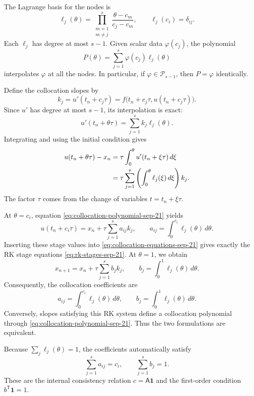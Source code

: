 The Lagrange basis for the nodes is
\begin{equation}\label{eq:lagrange-basis-sep-21}
 \ell_j(\theta)
   =\prod_{\substack{m=1\\m\neq j}}^s
     \frac{\theta-c_m}{c_j-c_m},
 \qquad \ell_j(c_i)=\delta_{ij}.
\end{equation}
Each \(\ell_j\) has degree at most \(s-1\). Given scalar data
\(\varphi(c_j)\), the polynomial
\[
 P(\theta)=\sum_{j=1}^s\varphi(c_j)\ell_j(\theta)
\]
interpolates \(\varphi\) at all the nodes. In particular, if
\(\varphi\in\mathcal P_{s-1}\), then \(P=\varphi\) identically.

Define the collocation slopes by
\[
 k_j=u'(t_n+c_j\tau)
    =f\bigl(t_n+c_j\tau,u(t_n+c_j\tau)\bigr).
\]
Since \(u'\) has degree at most \(s-1\), its interpolation is exact:
\begin{equation}\label{eq:collocation-derivative-sep-21}
 u'(t_n+\theta\tau)=\sum_{j=1}^s k_j\ell_j(\theta).
\end{equation}
Integrating and using the initial condition gives
\begin{align}
 u(t_n+\theta\tau)-x_n
  &=\tau\int_0^\theta u'(t_n+\xi\tau)\,d\xi\notag\\
  &=\tau\sum_{j=1}^s
      \left(\int_0^\theta\ell_j(\xi)\,d\xi\right)k_j.
      \label{eq:collocation-polynomial-sep-21}
\end{align}
The factor \(\tau\) comes from the change of variables
\(t=t_n+\xi\tau\).

At \(\theta=c_i\), equation
\eqref{eq:collocation-polynomial-sep-21} yields
\[
 u(t_n+c_i\tau)=x_n+\tau\sum_{j=1}^s a_{ij}k_j,
 \qquad
 a_{ij}=\int_0^{c_i}\ell_j(\theta)\,d\theta.
\]
Inserting these stage values into
\eqref{eq:collocation-equations-sep-21} gives exactly the RK stage
equations \eqref{eq:rk-stages-sep-21}. At \(\theta=1\), we obtain
\[
 x_{n+1}=x_n+\tau\sum_{j=1}^s b_jk_j,
 \qquad
 b_j=\int_0^1\ell_j(\theta)\,d\theta.
\]
Consequently, the collocation coefficients are
\begin{equation}\label{eq:collocation-coefficients-sep-21}
 \boxed{
  a_{ij}=\int_0^{c_i}\ell_j(\theta)\,d\theta,
  \qquad
  b_j=\int_0^1\ell_j(\theta)\,d\theta.}
\end{equation}
Conversely, slopes satisfying this RK system define a collocation
polynomial through \eqref{eq:collocation-polynomial-sep-21}.
Thus the two formulations are equivalent.

Because \(\sum_j\ell_j(\theta)=1\), the coefficients automatically
satisfy
\[
 \sum_{j=1}^s a_{ij}=c_i,
 \qquad
 \sum_{j=1}^s b_j=1.
\]
These are the internal consistency relation
\(c=\mathsf A\mathbf1\) and the first-order condition
\(b^{\mathsf T}\mathbf1=1\).

